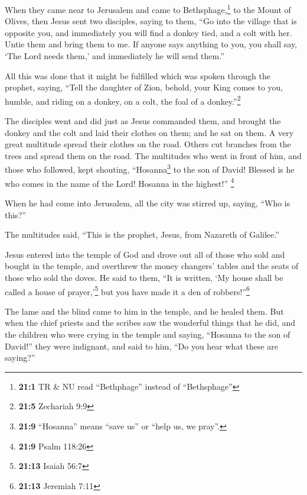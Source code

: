  When they came near to Jerusalem and came to
Bethsphage,\footnote{\textbf{21:1} TR \& NU read ``Bethphage'' instead
  of ``Bethsphage''} to the Mount of Olives, then Jesus sent two
disciples,  saying to them, ``Go into the village that is
opposite you, and immediately you will find a donkey tied, and a colt
with her. Untie them and bring them to me.  If anyone says
anything to you, you shall say, `The Lord needs them,' and immediately
he will send them.''

 All this was done that it might be fulfilled which was
spoken through the prophet, saying,  ``Tell the daughter
of Zion, behold, your King comes to you, humble, and riding on a donkey,
on a colt, the foal of a donkey.''\footnote{\textbf{21:5} Zechariah 9:9}

 The disciples went and did just as Jesus commanded them,
 and brought the donkey and the colt and laid their
clothes on them; and he sat on them.  A very great
multitude spread their clothes on the road. Others cut branches from the
trees and spread them on the road.  The multitudes who
went in front of him, and those who followed, kept shouting,
``Hosanna\footnote{\textbf{21:9} ``Hosanna'' means ``save us'' or ``help
  us, we pray''.} to the son of David! Blessed is he who comes in the
name of the Lord! Hosanna in the highest!'' \footnote{\textbf{21:9}
  Psalm 118:26}

 When he had come into Jerusalem, all the city was
stirred up, saying, ``Who is this?''

 The multitudes said, ``This is the prophet, Jesus, from
Nazareth of Galilee.''

 Jesus entered into the temple of God and drove out all
of those who sold and bought in the temple, and overthrew the money
changers' tables and the seats of those who sold the doves.
 He said to them, ``It is written, `My house shall be
called a house of prayer,'\footnote{\textbf{21:13} Isaiah 56:7} but you
have made it a den of robbers!''\footnote{\textbf{21:13} Jeremiah 7:11}

 The lame and the blind came to him in the temple, and he
healed them.  But when the chief priests and the scribes
saw the wonderful things that he did, and the children who were crying
in the temple and saying, ``Hosanna to the son of David!'' they were
indignant,  and said to him, ``Do you hear what these are
saying?''


